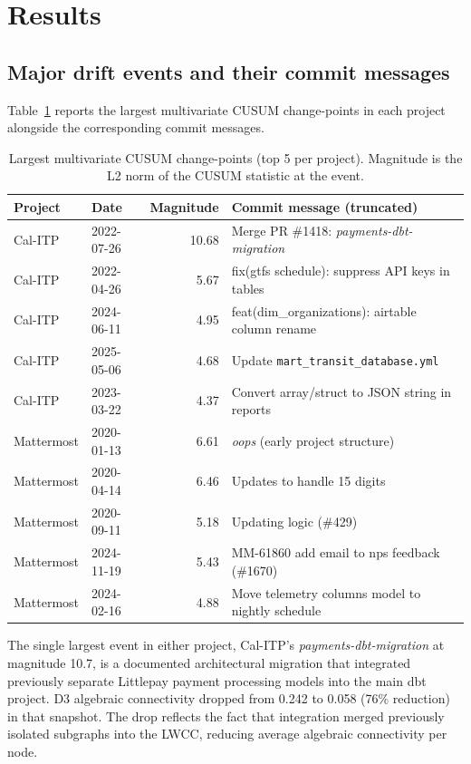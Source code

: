\documentclass[11pt,a4paper]{article}
\begin{document}
\section{Results}

\subsection{Major drift events and their commit messages}

Table~\ref{tab:events} reports the largest multivariate CUSUM
change-points in each project alongside the corresponding commit
messages.

\begin{table}[htb]
\centering
\caption{Largest multivariate CUSUM change-points (top 5 per project).
  Magnitude is the L2 norm of the CUSUM statistic at the event.}
\label{tab:events}
\small
\begin{tabular}{llrl}
\toprule
Project & Date & Magnitude & Commit message (truncated) \\
\midrule
Cal-ITP & 2022-07-26 & 10.68 & Merge PR \#1418: \textit{payments-dbt-migration} \\
Cal-ITP & 2022-04-26 & 5.67 & fix(gtfs schedule): suppress API keys in tables \\
Cal-ITP & 2024-06-11 & 4.95 & feat(dim\_organizations): airtable column rename \\
Cal-ITP & 2025-05-06 & 4.68 & Update \texttt{mart\_transit\_database.yml} \\
Cal-ITP & 2023-03-22 & 4.37 & Convert array/struct to JSON string in reports \\
\midrule
Mattermost & 2020-01-13 & 6.61 & \textit{oops} (early project structure) \\
Mattermost & 2020-04-14 & 6.46 & Updates to handle 15 digits \\
Mattermost & 2020-09-11 & 5.18 & Updating logic (\#429) \\
Mattermost & 2024-11-19 & 5.43 & MM-61860 add email to nps feedback (\#1670) \\
Mattermost & 2024-02-16 & 4.88 & Move telemetry columns model to nightly schedule \\
\bottomrule
\end{tabular}
\end{table}

The single largest event in either project, Cal-ITP's
\textit{payments-dbt-migration} at magnitude 10.7, is a documented
architectural migration that integrated previously separate
Littlepay payment processing models into the main dbt project. D3
algebraic connectivity dropped from 0.242 to 0.058 (76\% reduction)
in that snapshot. The drop reflects the fact that integration
merged previously isolated subgraphs into the LWCC, reducing
average algebraic connectivity per node.
\end{document}
